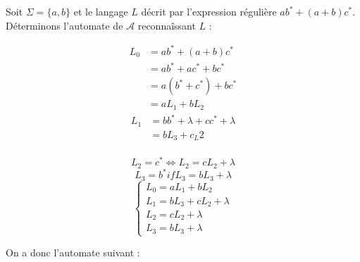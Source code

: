 \begin{example}
    Soit $ \Sigma = \{a,b\}$ et le langage $L$ décrit par l'expression régulière $ab^* + (a + b)c^*$. 
    Déterminons l'automate de $ \mathcal{A}$ reconnaîssant $L$ : 

    \begin{center}
        \begin{minipage}{0.45\textwidth}
            \begin{align*}
                L_0 &= ab^* + (a+b)c^* \\ 
                &= ab^* + ac^* + bc^* \\ 
                &= a(b^* + c^*) + bc^* \\ 
                &= aL_1 + bL_2 
            \end{align*}  
            \begin{align*}
                L_1 &= b b^* + \lambda + c c^* + \lambda \\ 
                &= bL_3 + c_L2 \\ 
            \end{align*}  
        \end{minipage}
        \hfill 
        \begin{minipage}{0.45\textwidth}
            \[ L_2 = c^* \iff L_2 = cL_2 + \lambda \] 
            \[ L_3 = b^* if L_3 = bL_3 + \lambda \]
            \[ 
                \begin{cases}
                    L_0 = aL_1 + bL_2 \\ 
                    L_1 = bL_3 + cL_2 + \lambda \\ 
                    L_2 = cL_2 + \lambda \\ 
                    L_3 = bL_3 + \lambda 
                \end{cases}
            \] 
        \end{minipage}
    \end{center}
   
    On a donc l'automate suivant : 
    \begin{center}
    \end{center}
\end{example}
